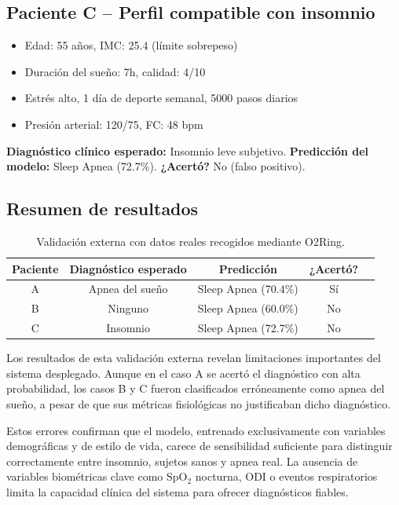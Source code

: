 \subsection{Paciente C – Perfil compatible con insomnio}

\begin{itemize}
    \item Edad: 55 años, IMC: 25.4 (límite sobrepeso)
    \item Duración del sueño: 7h, calidad: 4/10
    \item Estrés alto, 1 día de deporte semanal, 5000 pasos diarios
    \item Presión arterial: 120/75, FC: 48 bpm
\end{itemize}

\textbf{Diagnóstico clínico esperado:} Insomnio leve subjetivo.  
\textbf{Predicción del modelo:} Sleep Apnea (72.7\%).  
\textbf{¿Acertó?} No (falso positivo).


\subsection{Resumen de resultados}

\begin{table}[H]
\centering
\begin{tabular}{|c|c|c|c|c|}
\hline
\textbf{Paciente} & \textbf{Diagnóstico esperado} & \textbf{Predicción} & \textbf{¿Acertó?} \\
\hline
A & Apnea del sueño & Sleep Apnea (70.4\%) & Sí \\
B & Ninguno         & Sleep Apnea (60.0\%) & No \\
C & Insomnio        & Sleep Apnea (72.7\%) & No \\
\hline
\end{tabular}
\caption{Validación externa con datos reales recogidos mediante O2Ring.}
\end{table}


Los resultados de esta validación externa revelan limitaciones importantes del sistema desplegado. Aunque en el caso A se acertó el diagnóstico con alta probabilidad, los casos B y C fueron clasificados erróneamente como apnea del sueño, a pesar de que sus métricas fisiológicas no justificaban dicho diagnóstico.

Estos errores confirman que el modelo, entrenado exclusivamente con variables demográficas y de estilo de vida, carece de sensibilidad suficiente para distinguir correctamente entre insomnio, sujetos sanos y apnea real. La ausencia de variables biométricas clave como SpO$_2$ nocturna, ODI o eventos respiratorios limita la capacidad clínica del sistema para ofrecer diagnósticos fiables.


